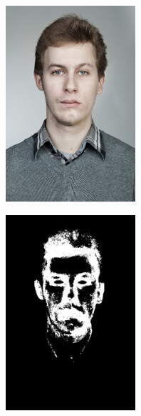 \begin{figure}[H]
\centering

\begin{subfigure}{.25\textwidth}
  \centering
  \includegraphics[width=0.53\textwidth]{img/fd3/fail2_input.jpg}
  \caption{}
\end{subfigure}%
\begin{subfigure}{.25\textwidth}
  \centering
  \includegraphics[width=0.53\textwidth]{img/fd3/fail2_estimatedSkinMak.png}
  \caption{}
\end{subfigure}%
\begin{subfigure}{.25\textwidth}

\end{subfigure}
\end{figure}
